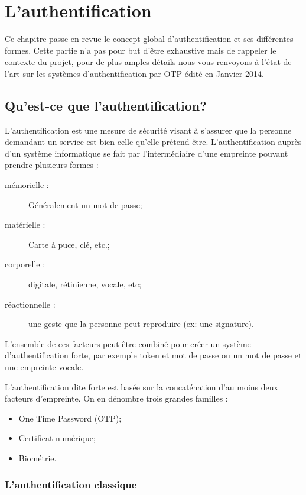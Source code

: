 \chapter{L'authentification}

	Ce chapitre passe en revue le concept global d'authentification et ses 
	différentes formes. Cette partie n'a pas pour but d'être exhaustive mais de 
	rappeler le contexte du projet, pour de plus amples détails nous vous 
	renvoyons à l'état de l'art sur les systèmes d'authentification par OTP édité 
	en Janvier 2014.

\section{Qu'est-ce que l'authentification?}

	L'authentification est une mesure de sécurité visant à s'assurer que la 
	personne demandant un service est bien celle qu'elle prétend être. 
	L'authentification auprès d'un système informatique se fait par 
	l'intermédiaire d'une empreinte pouvant prendre plusieurs formes :
	
	\begin{description}
		\item[mémorielle :] Généralement un mot de passe;
		\item[matérielle :] Carte à puce, clé, etc.;
		\item[corporelle :] digitale, rétinienne, vocale, etc;
		\item[réactionnelle :] une geste que la personne peut reproduire (ex: une 
		signature).
	\end{description}

	L'ensemble de ces facteurs peut être combiné pour créer un système 
	d'authentification forte, par exemple token et mot de passe ou un mot de passe et
	une empreinte vocale.
	
	L'authentification dite forte est basée sur la concaténation d'au moins deux 
	facteurs d'empreinte. On en dénombre trois grandes familles :
	
	\begin{itemize}
		\item One Time Password (OTP);
		\item Certificat numérique;
		\item Biométrie.
	\end{itemize}

\subsection{L'authentification classique}
	
